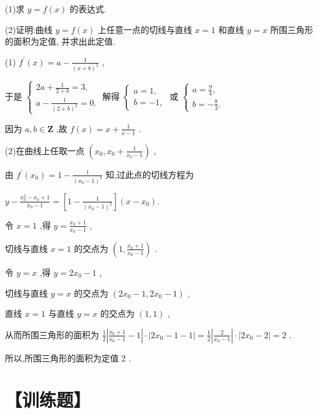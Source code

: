 \documentclass[10pt]{article}
\begin{document}
(1)求 \(y = f\left( x\right)\) 的表达式.

(2)证明:曲线 \(y = f\left( x\right)\) 上任意一点的切线与直线 \(x = 1\) 和直线 \(y = x\) 所围三角形的面积为定值, 并求出此定值.

(1) \({f}^{\prime }\left( x\right)  = a - \frac{1}{{\left( x + b\right) }^{2}}\) ,

于是 \(\left\{  \begin{array}{l} {2a} + \frac{1}{2 + b} = 3, \\  a - \frac{1}{{\left( 2 + b\right) }^{2}} = 0. \end{array}\right.\) 解得 \(\left\{  \begin{array}{l} a = 1, \\  b =  - 1, \end{array}\right.\) 或 \(\left\{  \begin{array}{l} a = \frac{9}{4}, \\  b =  - \frac{8}{3}. \end{array}\right.\)

因为 \(a,b \in  \mathbf{Z}\) ,故 \(f\left( x\right)  = x + \frac{1}{x - 1}\) .

(2)在曲线上任取一点 \(\left( {{x}_{0},{x}_{0} + \frac{1}{{x}_{0} - 1}}\right)\) ,

由 \({f}^{\prime }\left( {x}_{0}\right)  = 1 - \frac{1}{{\left( {x}_{0} - 1\right) }^{2}}\) 知,过此点的切线方程为

\(y - \frac{{x}_{0}^{2} - {x}_{0} + 1}{{x}_{0} - 1} = \left\lbrack  {1 - \frac{1}{{\left( {x}_{0} - 1\right) }^{2}}}\right\rbrack  \left( {x - {x}_{0}}\right) .\)

令 \(x = 1\) ,得 \(y = \frac{{x}_{0} + 1}{{x}_{0} - 1}\) ,

切线与直线 \(x = 1\) 的交点为 \(\left( {1,\frac{{x}_{0} + 1}{{x}_{0} - 1}}\right)\) .

令 \(y = x\) ,得 \(y = 2{x}_{0} - 1\) ,

切线与直线 \(y = x\) 的交点为 \(\left( {2{x}_{0} - 1,2{x}_{0} - 1}\right)\) ,

直线 \(x = 1\) 与直线 \(y = x\) 的交点为 \(\left( {1,1}\right)\) ,

从而所围三角形的面积为 \(\frac{1}{2}\left| {\frac{{x}_{0} + 1}{{x}_{0} - 1} - 1}\right|  \cdot  \left| {2{x}_{0} - 1 - 1}\right|  = \frac{1}{2}\left| \frac{2}{{x}_{0} - 1}\right|  \cdot  \left| {2{x}_{0} - 2}\right|  = 2\) .

所以,所围三角形的面积为定值 2 .

\section*{【训练题】}
\end{document}
